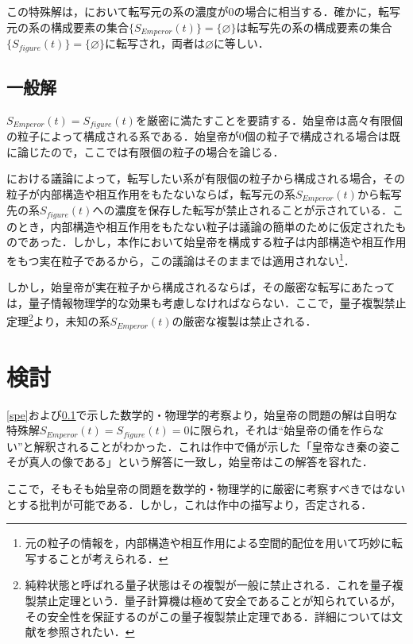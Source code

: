 \documentclass[10pt, a5paper, twoside]{jsarticle}
\theoremstyle{definition}
\begin{document}
			この特殊解は，\cite{sshimo}において転写元の系の濃度が0の場合に相当する．確かに，転写元の系の構成要素の集合$\{ S_{Emperor}(t) \} = \{ \varnothing \}$は転写先の系の構成要素の集合$\{ S_{figure}(t) \} = \{ \varnothing \}$に転写され，両者は$\varnothing$に等しい．

		\subsection{一般解}\label{gen}

			$ S_{Emperor}(t) = S_{figure}(t) $を厳密に満たすことを要請する．始皇帝は高々有限個の粒子によって構成される系である．始皇帝が0個の粒子で構成される場合は既に論じたので，ここでは有限個の粒子の場合を論じる．

			\cite{sshimo}における議論によって，転写したい系が有限個の粒子から構成される場合，その粒子が内部構造や相互作用をもたないならば，転写元の系$S_{Emperor}(t)$から転写先の系$S_{figure}(t)$への濃度を保存した転写が禁止されることが示されている．このとき，内部構造や相互作用をもたない粒子は議論の簡単のために仮定されたものであった．しかし，本作において始皇帝を構成する粒子は内部構造や相互作用をもつ実在粒子であるから，この議論はそのままでは適用されない\footnote{元の粒子の情報を，内部構造や相互作用による空間的配位を用いて巧妙に転写することが考えられる．}．

			しかし，始皇帝が実在粒子から構成されるならば，その厳密な転写にあたっては，量子情報物理学的な効果も考慮しなければならない．ここで，量子複製禁止定理\footnote{純粋状態と呼ばれる量子状態はその複製が一般に禁止される．これを量子複製禁止定理という．量子計算機は極めて安全であることが知られているが，その安全性を保証するのがこの量子複製禁止定理である．詳細については文献\cite{Hotta1,Hotta2}を参照されたい．}より，未知の系$S_{Emperor}(t)$の厳密な複製は禁止される．

		\section{検討}

			\ref{spe}および\ref{gen}で示した数学的・物理学的考察より，始皇帝の問題の解は自明な特殊解$ S_{Emperor}(t) = S_{figure}(t) = 0 $に限られ，それは“始皇帝の俑を作らない”と解釈されることがわかった．これは作中で俑が示した「皇帝なき秦の姿こそが真人の像である」という解答に一致し，始皇帝はこの解答を容れた．

			ここで，そもそも始皇帝の問題を数学的・物理学的に厳密に考察すべきではないとする批判が可能である．しかし，これは作中の描写より，否定される．
\end{document}
